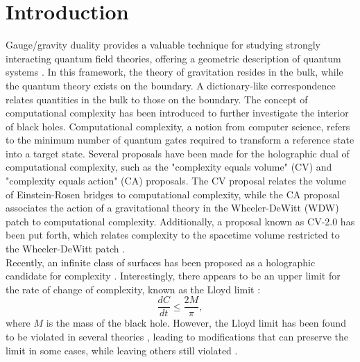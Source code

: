 \documentclass[]{article}
\begin{document}
\section{Introduction}
Gauge/gravity duality provides a valuable technique for studying strongly interacting quantum field theories, offering a geometric description of quantum systems \cite{mal}. In this framework, the theory of gravitation resides in the bulk, while the quantum theory exists on the boundary. A dictionary-like correspondence relates quantities in the bulk to those on the boundary. The concept of computational complexity has been introduced \cite{comp} to further investigate the interior of black holes. Computational complexity, a notion from computer science, refers to the minimum number of quantum gates required to transform a reference state into a target state. Several proposals have been made for the holographic dual of computational complexity, such as the "complexity equals volume" (CV) \cite{shock} and "complexity equals action" (CA) \cite{ca} proposals. The CV proposal relates the volume of Einstein-Rosen bridges to computational complexity, while the CA proposal associates the action of a gravitational theory in the Wheeler-DeWitt (WDW) patch to computational complexity. Additionally, a proposal known as CV-2.0  has been put forth, which relates complexity to the spacetime volume restricted to the Wheeler-DeWitt patch \cite{couch}.\\

Recently, an infinite class of surfaces has been proposed as a holographic candidate for complexity \cite{anything}. Interestingly, there appears to be an upper limit for the rate of change of complexity, known as the Lloyd limit \cite{lloyd}:
\begin{equation}
\frac{dC}{dt} \le \frac{2M}{\pi}, \label{lloyd}
\end{equation}
where $M$ is the mass of the black hole. However, the Lloyd limit has been found to be violated in several theories \cite{myers,l1,l2,l3,alish}, leading to modifications that can preserve the limit in some cases, while leaving others still violated \cite{mod1,mod2,mod3}.\\
\end{document}
